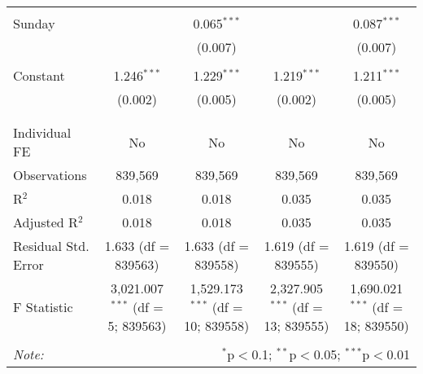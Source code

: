 \documentclass[
]{article}
\begin{document}
\begin{table}[!htbp]
{\begin{tabular}{@{\extracolsep{5pt}}lcccc}
  & & & & \\ 
 Sunday &  & 0.065$^{***}$ &  & 0.087$^{***}$ \\ 
  &  & (0.007) &  & (0.007) \\ 
  & & & & \\ 
 Constant & 1.246$^{***}$ & 1.229$^{***}$ & 1.219$^{***}$ & 1.211$^{***}$ \\ 
  & (0.002) & (0.005) & (0.002) & (0.005) \\ 
  & & & & \\ 
\hline \\[-1.8ex] 
Individual FE & No & No & No & No \\ 
Observations & 839,569 & 839,569 & 839,569 & 839,569 \\ 
R$^{2}$ & 0.018 & 0.018 & 0.035 & 0.035 \\ 
Adjusted R$^{2}$ & 0.018 & 0.018 & 0.035 & 0.035 \\ 
Residual Std. Error & 1.633 (df = 839563) & 1.633 (df = 839558) & 1.619 (df = 839555) & 1.619 (df = 839550) \\ 
F Statistic & 3,021.007$^{***}$ (df = 5; 839563) & 1,529.173$^{***}$ (df = 10; 839558) & 2,327.905$^{***}$ (df = 13; 839555) & 1,690.021$^{***}$ (df = 18; 839550) \\ 
\hline 
\hline \\[-1.8ex] 
\textit{Note:}  & \multicolumn{4}{r}{$^{*}$p$<$0.1; $^{**}$p$<$0.05; $^{***}$p$<$0.01} \\ 
\end{tabular}
} 
\end{table} 
\newpage
\end{document}
